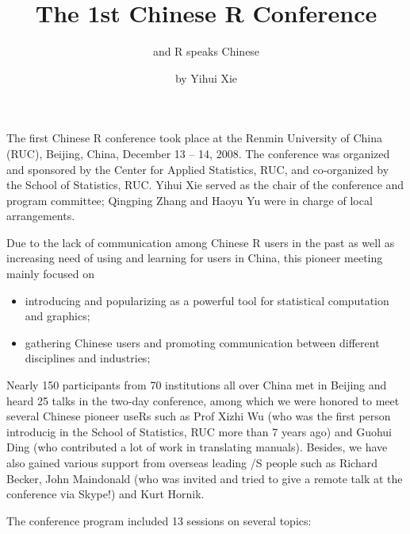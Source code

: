 \title{The 1st Chinese R Conference}
\subtitle{and R speaks Chinese}
\author{by Yihui Xie}

\maketitle

The first Chinese R conference took place at the Renmin University
of China (RUC), Beijing, China, December 13 -- 14, 2008. The
conference was organized and sponsored by the Center for Applied
Statistics, RUC, and co-organized by the School of Statistics, RUC.
Yihui Xie served as the chair of the conference and program
committee; Qingping Zhang and Haoyu Yu were in charge of local
arrangements.

Due to the lack of communication among Chinese R users in the past
as well as increasing need of using and learning \R{} for users in
China, this pioneer meeting mainly focused on

\begin{itemize}
  \item introducing and popularizing \R{} as a powerful tool for statistical
  computation and graphics;
  \item gathering Chinese \R{} users and promoting communication
  between different disciplines and industries;
\end{itemize}

Nearly 150 participants from 70 institutions all over China met in
Beijing and heard 25 talks in the two-day conference, among which we
were honored to meet several Chinese pioneer useRs such as Prof
Xizhi Wu (who was the first person introducig \R{} in the School of
Statistics, RUC more than 7 years ago) and Guohui Ding (who
contributed a lot of work in translating \R{} manuals). Besides, we
have also gained various support from overseas leading \R{}/S people
such as Richard Becker, John Maindonald (who was invited and tried
to give a remote talk at the conference via Skype!) and Kurt Hornik.

The conference program included 13 sessions on several topics:

